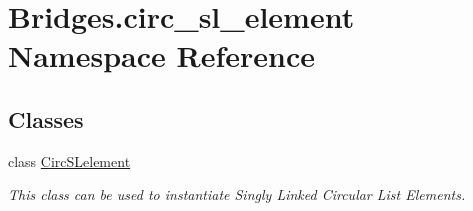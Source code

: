 \hypertarget{namespace_bridges_1_1circ__sl__element}{}\section{Bridges.\+circ\+\_\+sl\+\_\+element Namespace Reference}
\label{namespace_bridges_1_1circ__sl__element}
\subsection*{Classes}
\begin{DoxyCompactItemize}
\item 
class \hyperlink{class_bridges_1_1circ__sl__element_1_1_circ_s_lelement}{Circ\+S\+Lelement}
\begin{DoxyCompactList}\small\item\em This class can be used to instantiate Singly Linked Circular List Elements. \end{DoxyCompactList}\end{DoxyCompactItemize}
